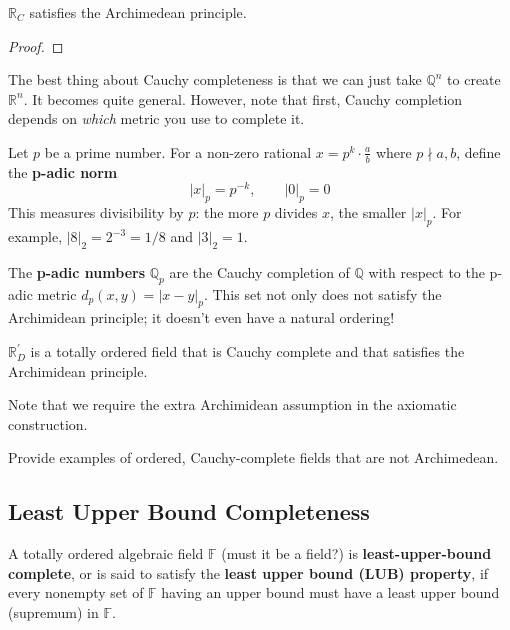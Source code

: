   \begin{theorem}
    $\mathbb{R}_C$ satisfies the Archimedean principle. 
  \end{theorem}
  \begin{proof}
    
  \end{proof}

  The best thing about Cauchy completeness is that we can just take $\mathbb{Q}^n$ to create $\mathbb{R}^n$. It becomes quite general. However, note that first, Cauchy completion depends on \textit{which} metric you use to complete it. 

  \begin{example}
    Let $p$ be a prime number. For a non-zero rational $x = p^k \cdot \frac{a}{b}$ where $p \nmid a, b$, define the \textbf{p-adic norm}
    \begin{equation}
      |x|_p = p^{-k}, \qquad |0|_p = 0
    \end{equation}
    This measures divisibility by $p$: the more $p$ divides $x$, the smaller $|x|_p$. For example, $|8|_2 = 2^{-3} = 1/8$ and $|3|_2 = 1$.

    The \textbf{p-adic numbers} $\mathbb{Q}_p$ are the Cauchy completion of $\mathbb{Q}$ with respect to the p-adic metric $d_p(x,y) = |x - y|_p$. This set not only does not satisfy the Archimidean principle; it doesn't even have a natural ordering! 
  \end{example} 

  \begin{definition}
    $\mathbb{R}_D^\prime$ is a totally ordered field that is Cauchy complete and that satisfies the Archimidean principle.
  \end{definition}

  Note that we require the extra Archimidean assumption in the axiomatic construction. 

  \begin{example}
    Provide examples of ordered, Cauchy-complete fields that are not Archimedean. 
  \end{example}

\subsection{Least Upper Bound Completeness}

  \begin{definition}
    A totally ordered algebraic field $\mathbb{F}$ (must it be a field?) is \textbf{least-upper-bound complete}, or is said to satisfy the \textbf{least upper bound (LUB) property}, if every nonempty set of $\mathbb{F}$ having an upper bound must have a least upper bound (supremum) in $\mathbb{F}$. 
  \end{definition} 

